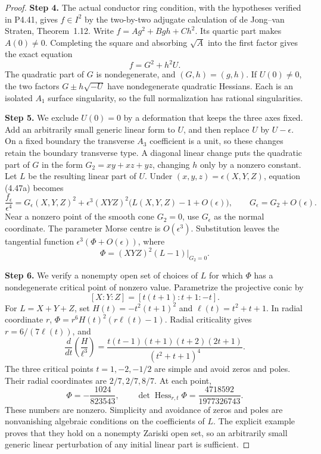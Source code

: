 \begin{proof}
\noindent\textbf{Step 4.} The actual conductor ring condition, with the hypotheses
verified in P4.41, gives $f\in I^2$ by the two-by-two
adjugate calculation of de Jong--van Straten,
Theorem~1.12. Write $f=A g^2+Bgh+Ch^2$.
Its quartic part makes $A(0)\ne0$. Completing the square
and absorbing $\sqrt A$ into the first factor gives
the exact equation
\[
                         f=G^2+h^2U.                 \tag{4.47a}
\]
The quadratic part of $G$ is nondegenerate, and
$(G,h)=(g,h)$. If $U(0)\ne0$, the two factors
$G\pm h\sqrt{-U}$ have nondegenerate quadratic
Hessians. Each is an isolated $A_1$ surface singularity,
so the full normalization has rational singularities.

\noindent\textbf{Step 5.} We exclude $U(0)=0$ by a deformation that keeps the
three axes fixed. Add an arbitrarily small generic
linear form to $U$, and then replace $U$ by
$U-\epsilon$. On a fixed boundary the transverse
$A_3$ coefficient is a unit, so these changes retain
the boundary transverse type. A diagonal linear change
puts the quadratic part of $G$ in the form
$G_2=xy+xz+yz$, changing $h$ only by a nonzero constant.
Let $L$ be the resulting linear part of $U$.
Under $(x,y,z)=\epsilon(X,Y,Z)$, equation (4.47a) becomes
\[
 \frac{f_\epsilon}{\epsilon^4}
   =G_\epsilon(X,Y,Z)^2+\epsilon^3(XYZ)^2
                          \bigl(L(X,Y,Z)-1+O(\epsilon)\bigr),
 \qquad G_\epsilon=G_2+O(\epsilon).
\]
Near a nonzero point of the smooth cone $G_2=0$,
use $G_\epsilon$ as the normal coordinate. The
parameter Morse centre is $O(\epsilon^3)$.
Substitution leaves the tangential function
$\epsilon^3(\Phi+O(\epsilon))$, where
\[
                 \Phi=(XYZ)^2(L-1)|_{G_2=0}.
\]

\noindent\textbf{Step 6.} We verify a nonempty open set of choices of $L$ for
which $\Phi$ has a nondegenerate critical point of
nonzero value. Parametrize the projective conic by
\[
              [X:Y:Z]=[t(t+1):t+1:-t].
\]
For $L=X+Y+Z$, set
$H(t)=-t^2(t+1)^2$ and $\ell(t)=t^2+t+1$.
In radial coordinate $r$,
$\Phi=r^6H(t)^2(r\ell(t)-1)$.
Radial criticality gives $r=6/(7\ell(t))$, and
\[
 \frac{d}{dt}\left(\frac{H}{\ell^3}\right)
  =\frac{t(t-1)(t+1)(t+2)(2t+1)}{(t^2+t+1)^4}.
\]
The three critical points $t=1,-2,-1/2$ are simple
and avoid zeros and poles. Their radial coordinates
are $2/7,2/7,8/7$. At each point,
\[
       \Phi=-\frac{1024}{823543},\qquad
       \det\operatorname{Hess}_{r,t}\Phi
                     =\frac{4718592}{1977326743}.
\]
These numbers are nonzero. Simplicity and avoidance
of zeros and poles are nonvanishing algebraic conditions
on the coefficients of $L$. The explicit example proves
that they hold on a nonempty Zariski open set, so an
arbitrarily small generic linear perturbation of any
initial linear part is sufficient.


\end{proof}
